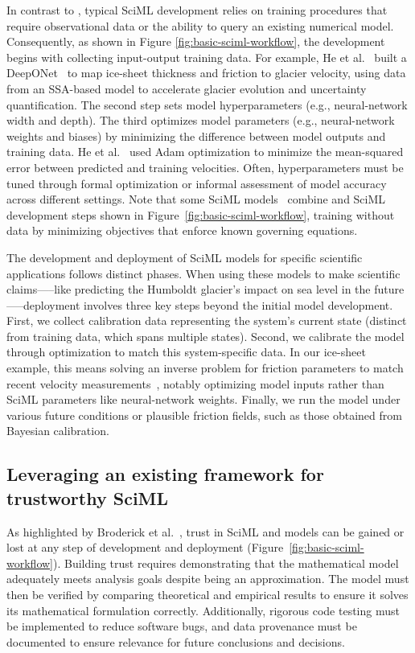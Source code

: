 In contrast to \CSE{}, typical SciML development relies on training procedures that require observational data or the ability to query an existing numerical model. Consequently, as shown in Figure \ref{fig:basic-sciml-workflow}, the development begins with collecting input-output training data. For example, He et al.~\cite{He_PKS_JCP_2023} built a DeepONet~\cite{Lu_JPZK_NMI_2021} to map ice-sheet thickness and friction to glacier velocity, using data from an SSA-based \CSE{} model to accelerate glacier evolution and uncertainty quantification. 
The second step sets model hyperparameters (e.g., neural-network width and depth). The third optimizes model parameters (e.g., neural-network weights and biases) by minimizing the difference between model outputs and training data. He et al.~\cite{He_PKS_JCP_2023} used Adam optimization to minimize the mean-squared error between predicted and training velocities. Often, hyperparameters must be tuned through formal optimization or informal assessment of model accuracy across different settings.
Note that some SciML models~\cite{Sirignano_S_JCP_2018, W_B_CMS_2018} combine \CSE{} and SciML development steps shown in Figure~\ref{fig:basic-sciml-workflow}, training without data by minimizing objectives that enforce known governing equations.

The development and deployment of SciML models for specific scientific applications follows distinct phases. When using these models to make scientific claims—--like predicting the Humboldt glacier's impact on sea level in the future—--deployment involves three key steps beyond the initial model development. 
First, we collect calibration data representing the system's current state (distinct from training data, which spans multiple states). 
Second, we calibrate the model through optimization to match this system-specific data. In our ice-sheet example, this means solving an inverse problem for friction parameters to match recent velocity measurements~\cite{Jakeman_SHHHP_ESD_2024}, notably optimizing model inputs rather than SciML parameters like neural-network weights. 
Finally, we run the model under various future conditions or plausible friction fields, such as those obtained from Bayesian calibration.

\subsection{Leveraging an existing \CSE{} framework for trustworthy SciML}
\label{sec:framework}

As highlighted by Broderick et al.~\cite{Broderick_GMSZ_SA_2023}, trust in SciML and \CSE{} models can be gained or lost at any step of development and deployment (Figure~\ref{fig:basic-sciml-workflow}). Building trust requires demonstrating that the mathematical model adequately meets analysis goals despite being an approximation. The model must then be verified by comparing theoretical and empirical results to ensure it solves its mathematical formulation correctly. Additionally, rigorous code testing must be implemented to reduce software bugs, and data provenance must be documented to ensure relevance for future conclusions and decisions.

